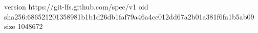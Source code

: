 version https://git-lfs.github.com/spec/v1
oid sha256:686521201358981b1b1d26db1faf79a46a4cc012dd67a2b01a381f6fa1b5ab09
size 1048672
